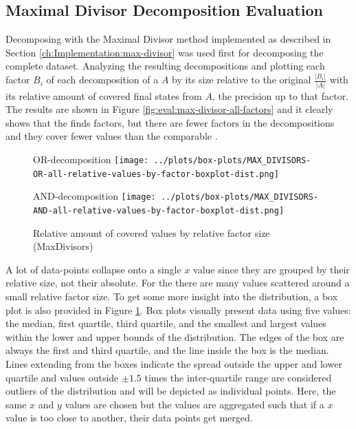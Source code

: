 \subsection{Maximal Divisor Decomposition Evaluation}
\label{ch:Evaluation:decomposition-quality:max-divisor}
Decomposing with the Maximal Divisor method implemented as described in Section \ref{ch:Implementation:max-divisor} was used first for decomposing the complete dataset.
Analyzing the resulting decompositions and plotting each factor $B_i$ of each decomposition of a \DFA $A$ by its size relative to the original $\frac{|B_i|}{|A|}$ with its relative amount of covered final states from $A$, the precision up to that factor.
The results are shown in Figure \ref{fig:eval:max-divisor-all-factors} and it clearly shows that the \orDecomp finds factors, but there are fewer factors in the decompositions and they cover fewer values than the comparable \andDecomp.
\begin{figure}[h]
	\begin{minipage}[h]{0.49\linewidth}
		\centering
		OR-decomposition
		\texttt{[image: ../plots/box-plots/MAX\_DIVISORS-OR-all-relative-values-by-factor-boxplot-dist.png]}
	\end{minipage}
	\begin{minipage}[h]{0.49\linewidth}
		\centering
		AND-decomposition
		\texttt{[image: ../plots/box-plots/MAX\_DIVISORS-AND-all-relative-values-by-factor-boxplot-dist.png]}
	\end{minipage}
	\caption{Relative amount of covered values by relative factor size (MaxDivisors)}
	\label{fig:eval:max-divisor-all-factors-box-plot}
\end{figure}
A lot of data-points collapse onto a single $x$ value since they are grouped by their relative size, not their absolute.
For the \andDecomp there are many values scattered around a small relative factor size.
To get some more insight into the distribution, a box plot is also provided in Figure \ref{fig:eval:max-divisor-all-factors-box-plot}.
Box plots visually present data using five values: the median, first quartile, third quartile, and the smallest and largest values within the lower and upper bounds of the distribution.
The edges of the box are always the first and third quartile, and the line inside the box is the median.
Lines extending from the boxes indicate the spread outside the upper and lower quartile and values outside $\pm 1.5$ times the inter-quartile range are considered outliers of the distribution and will be depicted as individual points.
Here, the same $x$ and $y$ values are chosen but the values are aggregated such that if a $x$ value is too close to another, their data points get merged.
